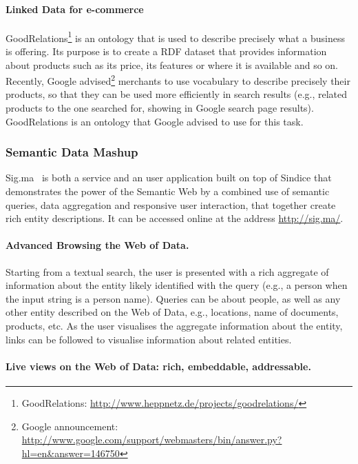\paragraph{Linked Data for e-commerce}

GoodRelations\footnote{GoodRelations:
\url{http://www.heppnetz.de/projects/goodrelations/}} is an ontology that is
used to describe precisely what a business is offering. Its purpose is to
create a RDF dataset that provides information about products such as its
price, its features or where it is available and so on. Recently, Google
advised\footnote{Google announcement:
\url{http://www.google.com/support/webmasters/bin/answer.py?hl=en&answer=146750}}
merchants to use vocabulary to describe precisely their products, so that they
can be used more efficiently in search results (e.g., related products to the
one searched for, showing in Google search page results). GoodRelations is an
ontology that Google advised to use for this task.

\subsubsection{Semantic Data Mashup}

Sig.ma~\cite{tummarello:2010:sigma} is both a service and an user application
built on top of Sindice that demonstrates the power of the Semantic Web by a
combined use of semantic queries, data aggregation and responsive user
interaction, that together create rich entity descriptions. It can be accessed
online at the address \url{http://sig.ma/}.

\paragraph{Advanced Browsing the Web of Data.}

Starting from a textual search, the user is presented with a rich aggregate of information about the entity likely identified with the query (e.g., a person when the input string is a person name). Queries can be about people, as well as any other entity described on the Web of Data, e.g., locations, name of documents, products, etc. As the user visualises the aggregate information about the entity, links can be followed to visualise information about related entities.

\paragraph{Live views on the Web of Data: rich, embeddable, addressable.}


